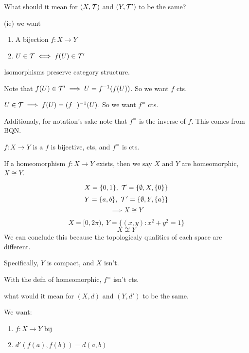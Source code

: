 \documentclass[12pt]{article}
\begin{document}
 What should it mean for 
\((X,\mathcal T)\) and \((Y,\mathcal T')\) to be the same?


(ie) we want
\begin{enumerate}
    \item A bijection \(f:X\to Y\)
    \item \(U\in\mathcal T\iff f(U)\in\mathcal T'\)
\end{enumerate}    

Isomorphisms preserve category structure.


\bboxnote
\begin{note}
    Note that \(f(U)\in\mathcal T'\implies U=f^{-1}(f(U))\). 
    So we want \(f\) cts.

    \(U\in\mathcal T\implies f(U)=(f^{=})^{-1}(U)\).
    So we want \(f^{=}\) cts.

    Additionaly, for notation's sake note that
    \(f^{=}\) is the inverse of \(f\). This
    comes from BQN.
\end{note}
\ebox

\bboxdefn
\begin{defn}[Homeomorphism]
    \(f:X\to Y\) is a  
    \(f\) is bijective, cts, and \(f^=\) is cts.
\end{defn}
\ebox

\bboxdefn
\begin{defn}[Homeomorphic]
    If a homeomorphism \(f:X\to Y\) exists,
    then we say \(X\) and \(Y\) are homeomorphic,
    \(X\cong Y\).
\end{defn}
\ebox

\bboxexam
\begin{exam}
    \[
        X=\{0,1\},\ \mathcal T=\{\emptyset, X, \{0\}\}
    \]
    \[
        Y=\{a,b\},\ \TT'=\{\emptyset, Y, \{a\}\}
    \]
    \[
        \implies X\cong Y
    \]
\end{exam}
\ebox

\bboxexam
\begin{exam}
    \[
        X=[0,2\pi),\ Y=\{(x,y):x^2+y^2=1\}
    \]
    \[
        X\not\cong Y
    \]
    We can conclude this because the topologicaly
    qualities of each space are different.

    Specifically, \(Y\) is compact, and \(X\) isn't.

    With the defn of homeomorphic, \(f^=\) isn't cts.
\end{exam}
\ebox

 what would it mean for \((X,d)\) and 
\((Y,d')\) to be the same.

We want:
\begin{enumerate}
    \item \(f:X\to Y\) bij
    \item \(d'(f(a),f(b))=d(a,b)\)
\end{enumerate}
\end{document}
